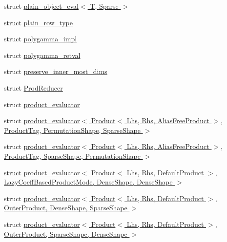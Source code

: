 \begin{DoxyCompactItemize}
\item 
struct \hyperlink{struct_eigen_1_1internal_1_1plain__object__eval_3_01_t_00_01_sparse_01_4}{plain\+\_\+object\+\_\+eval$<$ T, Sparse $>$}
\item 
struct \hyperlink{struct_eigen_1_1internal_1_1plain__row__type}{plain\+\_\+row\+\_\+type}
\item 
struct \hyperlink{struct_eigen_1_1internal_1_1polygamma__impl}{polygamma\+\_\+impl}
\item 
struct \hyperlink{struct_eigen_1_1internal_1_1polygamma__retval}{polygamma\+\_\+retval}
\item 
struct \hyperlink{struct_eigen_1_1internal_1_1preserve__inner__most__dims}{preserve\+\_\+inner\+\_\+most\+\_\+dims}
\item 
struct \hyperlink{struct_eigen_1_1internal_1_1_prod_reducer}{Prod\+Reducer}
\item 
struct \hyperlink{struct_eigen_1_1internal_1_1product__evaluator}{product\+\_\+evaluator}
\item 
struct \hyperlink{struct_eigen_1_1internal_1_1product__evaluator_3_01_product_3_01_lhs_00_01_rhs_00_01_alias_free_0706ef7a5a2e7de13f2e1755913a650d}{product\+\_\+evaluator$<$ Product$<$ Lhs, Rhs, Alias\+Free\+Product $>$, Product\+Tag, Permutation\+Shape, Sparse\+Shape $>$}
\item 
struct \hyperlink{struct_eigen_1_1internal_1_1product__evaluator_3_01_product_3_01_lhs_00_01_rhs_00_01_alias_free_9d3be1aa43ce7749965c0caa1184b53c}{product\+\_\+evaluator$<$ Product$<$ Lhs, Rhs, Alias\+Free\+Product $>$, Product\+Tag, Sparse\+Shape, Permutation\+Shape $>$}
\item 
struct \hyperlink{struct_eigen_1_1internal_1_1product__evaluator_3_01_product_3_01_lhs_00_01_rhs_00_01_default_pro06ca9210bc576c533682d6dfc3cec111}{product\+\_\+evaluator$<$ Product$<$ Lhs, Rhs, Default\+Product $>$, Lazy\+Coeff\+Based\+Product\+Mode, Dense\+Shape, Dense\+Shape $>$}
\item 
struct \hyperlink{struct_eigen_1_1internal_1_1product__evaluator_3_01_product_3_01_lhs_00_01_rhs_00_01_default_pro2587512d8613ab7eaf4e89d5bc171599}{product\+\_\+evaluator$<$ Product$<$ Lhs, Rhs, Default\+Product $>$, Outer\+Product, Dense\+Shape, Sparse\+Shape $>$}
\item 
struct \hyperlink{struct_eigen_1_1internal_1_1product__evaluator_3_01_product_3_01_lhs_00_01_rhs_00_01_default_pro494452499cb2dffb7b0f87034815802e}{product\+\_\+evaluator$<$ Product$<$ Lhs, Rhs, Default\+Product $>$, Outer\+Product, Sparse\+Shape, Dense\+Shape $>$}

\end{DoxyCompactItemize}
